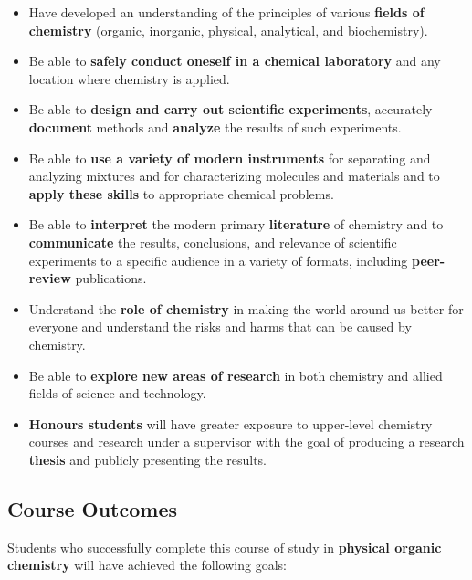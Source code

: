 \begin{itemize}
\item Have developed an understanding of the principles of various \textbf{fields of chemistry} (organic, inorganic, physical, analytical, and biochemistry).
\item Be able to \textbf{safely conduct oneself in a chemical laboratory} and any location where chemistry is applied.
\item Be able to \textbf{design and carry out scientific experiments}, accurately \textbf{document} methods and \textbf{analyze} the results of such experiments.
\item Be able to \textbf{use a variety of modern instruments} for separating and analyzing mixtures and for characterizing molecules and materials and to \textbf{apply these skills} to appropriate chemical problems.
\item Be able to \textbf{interpret} the modern primary \textbf{literature} of chemistry and to \textbf{communicate} the results, conclusions, and relevance of scientific experiments to a specific audience in a variety of formats, including \textbf{peer-review} publications.
\item Understand the \textbf{role of chemistry} in making the world around us better for everyone and understand the risks and harms that can be caused by chemistry.
\item Be able to \textbf{explore new areas of research} in both chemistry and allied fields of science and technology.
\item \textbf{Honours students} will have greater exposure to upper-level chemistry courses and research under a supervisor with the goal of producing a research \textbf{thesis} and publicly presenting the results.
\end{itemize}

\subsection{Course Outcomes}

Students who successfully complete this course of study in \textbf{physical organic chemistry} will have achieved the following goals:

